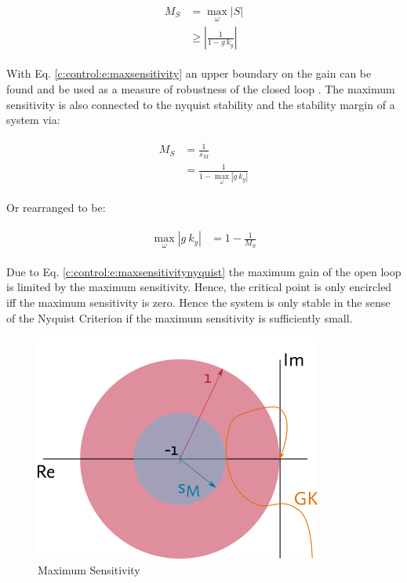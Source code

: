 \begin{align}
\begin{split}
M_S & = \max_\omega \left| S \right| \\
& \geq \left| \frac{1}{1 - g~k_y}\right|
\end{split}
\label{c:control:e:maxsensitivity}
\end{align}

With Eq. \ref{c:control:e:maxsensitivity} an upper boundary on the gain can be found and be used as a measure of robustness of the closed loop \cite[p.323 ff.]{Astrom2009FeedbackEngineers}. The maximum sensitivity is also connected to the nyquist stability and the stability margin of a system via:

\begin{align}
\begin{split}
M_S &= \frac{1}{s_M} \\
&= \frac{1}{1 - \max_\omega \left| g ~k_y \right|}
\end{split}
\label{c:control:e:maxsensitivitynyquist}
\end{align}

Or rearranged to be:

\begin{align}
\begin{split}
\max_\omega \left| g~k_y\right| &= 1 - \frac{1}{M_S}
\end{split}
\end{align}

Due to Eq. \ref{c:control:e:maxsensitivitynyquist} the maximum gain of the open loop is limited by the maximum sensitivity. Hence, the critical point is only encircled iff the maximum sensitivity is zero. Hence the system is only stable in the sense of the Nyquist Criterion if the maximum sensitivity is sufficiently small.\\

\begin{figure}[H]
\begin{minipage}[b]{\textwidth}
\centering
\includegraphics[scale=1]{./Graphics/MaximumSensitivity.png}
\caption{Maximum Sensitivity}
\label{c:control:f:MaximumSensitivity}
\end{minipage}
\end{figure}


